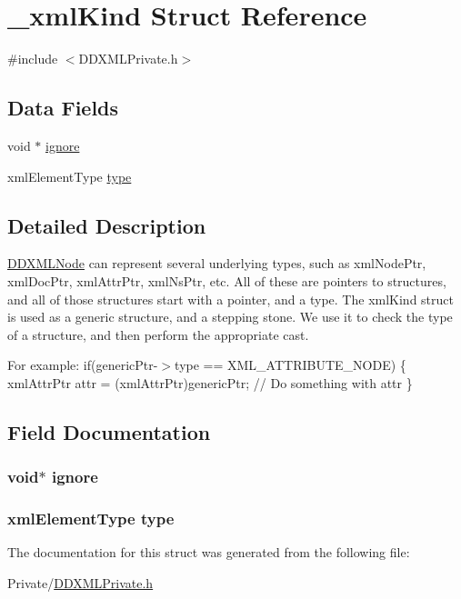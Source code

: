 \hypertarget{struct__xml_kind}{
\section{\_\-xmlKind Struct Reference}
\label{struct__xml_kind}
}


{\ttfamily \#include $<$DDXMLPrivate.h$>$}

\subsection*{Data Fields}
\begin{DoxyCompactItemize}
\item 
void $\ast$ \hyperlink{struct__xml_kind_a831fa35e52ad47d2360d29adf34a3028}{ignore}
\item 
xmlElementType \hyperlink{struct__xml_kind_ac5b2f541d66059a7c8de2599ba543e70}{type}
\end{DoxyCompactItemize}


\subsection{Detailed Description}
\hyperlink{interface_d_d_x_m_l_node}{DDXMLNode} can represent several underlying types, such as xmlNodePtr, xmlDocPtr, xmlAttrPtr, xmlNsPtr, etc. All of these are pointers to structures, and all of those structures start with a pointer, and a type. The xmlKind struct is used as a generic structure, and a stepping stone. We use it to check the type of a structure, and then perform the appropriate cast.

For example: if(genericPtr-\/$>$type == XML\_\-ATTRIBUTE\_\-NODE) \{ xmlAttrPtr attr = (xmlAttrPtr)genericPtr; // Do something with attr \} 

\subsection{Field Documentation}
\hypertarget{struct__xml_kind_a831fa35e52ad47d2360d29adf34a3028}{
\subsubsection[{ignore}]{\setlength{\rightskip}{0pt plus 5cm}void$\ast$ {\bf ignore}}}
\label{struct__xml_kind_a831fa35e52ad47d2360d29adf34a3028}
\hypertarget{struct__xml_kind_ac5b2f541d66059a7c8de2599ba543e70}{
\subsubsection[{type}]{\setlength{\rightskip}{0pt plus 5cm}xmlElementType {\bf type}}}
\label{struct__xml_kind_ac5b2f541d66059a7c8de2599ba543e70}


The documentation for this struct was generated from the following file:\begin{DoxyCompactItemize}
\item 
Private/\hyperlink{_d_d_x_m_l_private_8h}{DDXMLPrivate.h}\end{DoxyCompactItemize}
